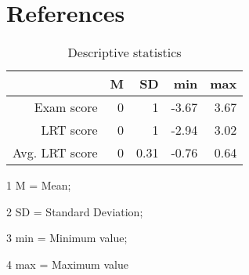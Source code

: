 \documentclass[
  english,
  man]{apa6}
\begin{document}
\newpage

\hypertarget{references}{%
\section{References}\label{references}}

\FloatBarrier
\begin{table}[ht]

\centering

\caption{Descriptive statistics}

\label{t1}

\begin{tabular}{r|rrrr}

\hline

 & M & SD & min & max \\

\hline

Exam score & 0 & 1 & -3.67 & 3.67 \\

LRT score & 0 & 1 & -2.94  & 3.02 \\

Avg. LRT score & 0 & 0.31 & -0.76  &  0.64 \\

\hline

\end{tabular}

\begin{tablenotes}

\item[1] M = Mean;
\item[2] SD = Standard Deviation;
\item[3] min =  Minimum value;
\item[4] max = Maximum value
\end{tablenotes}
\end{table}
\FloatBarrier
\end{document}
